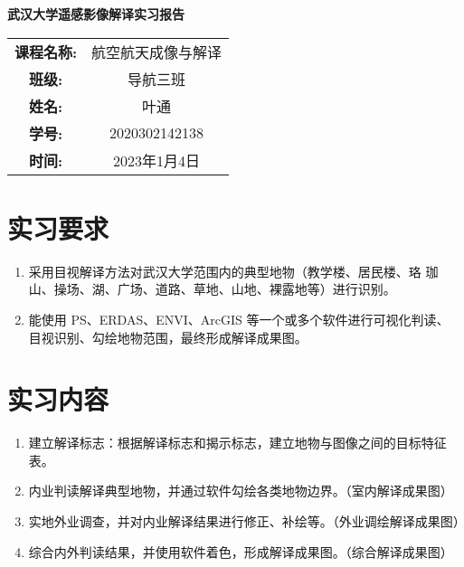 \documentclass{ctexart}
\begin{document}
\thispagestyle{empty}
\begin{center}
	\huge\textbf{武汉大学遥感影像解译实习报告}
\end{center}
\vfill

\begin{table}[h]
	\centering
	\Large
	\begin{tabular}{cc}
	\textbf{课程名称:}&航空航天成像与解译\\ \cline{2-2}
	\textbf{班级:}&导航三班\\ \cline{2-2}
	\textbf{姓名:}&叶通\\ \cline{2-2}
	\textbf{学号:}&2020302142138\\ \cline{2-2}
	\textbf{时间:}&2023年1月4日\\ \cline{2-2}
	\end{tabular}
\end{table}

\newpage
{}
\setcounter{page}{1}
\tableofcontents


\newpage
{}
\setcounter{page}{1}

\section{实习要求}
\begin{enumerate}[(1)]
\item 采用目视解译方法对武汉大学范围内的典型地物（教学楼、居民楼、珞
珈山、操场、湖、广场、道路、草地、山地、裸露地等）进行识别。
\item 能使用 PS、ERDAS、ENVI、ArcGIS 等一个或多个软件进行可视化判读、
目视识别、勾绘地物范围，最终形成解译成果图。
\end{enumerate}
\section{实习内容}
\begin{enumerate}[(1)]
\item 建立解译标志：根据解译标志和揭示标志，建立地物与图像之间的目标特征表。
\item 内业判读解译典型地物，并通过软件勾绘各类地物边界。（室内解译成果图）
\item 实地外业调查，并对内业解译结果进行修正、补绘等。（外业调绘解译成果图）
\item 综合内外判读结果，并使用软件着色，形成解译成果图。（综合解译成果图）
\end{enumerate}
\end{document}
